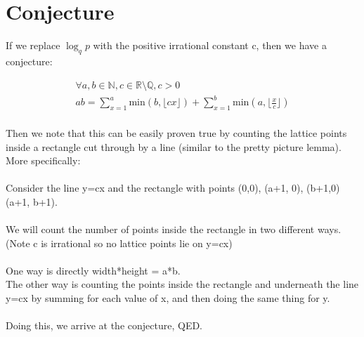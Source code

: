 \documentclass{article}
\begin{document}
\section{Conjecture} 
If we replace $\log_q p$ with the positive irrational constant c, then we have a conjecture:
\begin{tcolorbox}
\begin{equation*}
\begin{split}
    \forall a,b \in \mathbb{N}, c \in \mathbb{R} \setminus \mathbb{Q}, c>0\\
    ab = \sum_{x=1}^a \text{min}(b, \big\lfloor cx\big\rfloor) + \sum_{x=1}^b \text{min}(a, \big\lfloor \frac{x}{c} \big\rfloor)\\
\end{split}
\end{equation*}
\end{tcolorbox}

Then we note that this can be easily proven true by counting the lattice points inside a rectangle cut through by a line (similar to the pretty picture lemma). More specifically:\\\\
Consider the line y=cx and the rectangle with points (0,0), (a+1, 0), (b+1,0) (a+1, b+1).\\\\
We will count the number of points inside the rectangle in two different ways. (Note c is irrational so no lattice points lie on y=cx)\\\\
One way is directly width*height = a*b.\\
The other way is counting the points inside the rectangle and underneath the line y=cx by summing for each value of x, and then doing the same thing for y.\\\\
Doing this, we arrive at the conjecture, QED.
\end{document}
